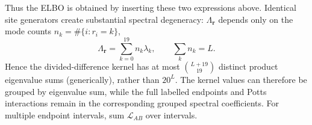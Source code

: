 \documentclass[10pt]{article}
\begin{document}
Thus the ELBO is obtained by inserting these two expressions above.  Identical
site generators create substantial spectral degeneracy:
\(\Lambda_{\boldsymbol r}\) depends only on the mode counts
\(n_k=\#\{i:r_i=k\}\),
\[
 \Lambda_{\boldsymbol r}=\sum_{k=0}^{19}n_k\lambda_k,\qquad \sum_k n_k=L.
\]
Hence the divided-difference kernel has at most
\(\binom{L+19}{19}\) distinct product eigenvalue sums (generically), rather
than \(20^L\).  The kernel values can therefore be grouped by eigenvalue sum,
while the full labelled endpoints and Potts interactions remain in the
corresponding grouped spectral coefficients.  For multiple endpoint intervals,
sum \(\mathcal L_{AB}\) over intervals.
\end{document}
